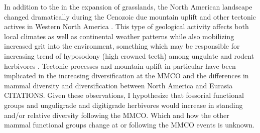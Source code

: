 \documentclass[12pt,letterpaper]{article}
\begin{document}
In addition to the in the expansion of grasslands, the North American landscape changed dramatically during the Cenozoic due mountain uplift and other tectonic actives in Western North America \citep{Blois2009,Eronen2015,Janis2008a,Badgley2013,Badgley2014,Badgley2017}. This type of geological activity affects both local climates as well as continental weather patterns while also mobilizing increased grit into the environment, something which may be responsible for increasing trend of hyposodony (high crowned teeth) among ungulate and rodent herbivores \citep{Janis1993b,Jardine2012,Jernvall2002,Damuth2011}. Tectonic processes and mountain uplift in particular have been implicated in the increasing diversification at the MMCO \citep{Badgley2013,Janis2008a,Badgley2014,Badgley2010,Finarelli2010} and the differences in mammal diversity and diversification between North America and Eurasia CITATIONS. Given these observations, I hypothesize that fossorial functional groups and unguligrade and digitigrade herbivores would increase in standing and/or relative diversity following the MMCO. Which and how the other mammal functional groups change at or following the MMCO events is unknown.

\end{document}
